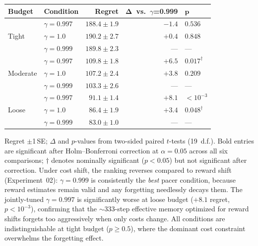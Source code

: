 \begin{center}
\small
\label{tab:exp03_ablation}
\begin{tabular}{@{}llrrl@{}}
\toprule
\textbf{Budget} & \textbf{Condition} & \textbf{Regret} & $\boldsymbol{\Delta}$\textbf{\ vs.\ $\gamma$=0.999} & $\boldsymbol{p}$ \\
\midrule
\multirow{3}{*}{Tight}
  & $\gamma{=}0.997$ & $188.4 \pm 1.9$ & $-1.4$ & $0.536$ \\
  & $\gamma{=}1.0$   & $190.2 \pm 2.7$ & $+0.4$ & $0.848$ \\
  & $\gamma{=}0.999$ & $189.8 \pm 2.3$ & --- & --- \\[2pt]
\multirow{3}{*}{Moderate}
  & $\gamma{=}0.997$ & $109.8 \pm 1.8$ & $+6.5$ & $0.017^\dagger$ \\
  & $\gamma{=}1.0$   & $107.2 \pm 2.4$ & $+3.8$ & $0.209$ \\
  & $\gamma{=}0.999$ & $103.3 \pm 2.6$ & --- & --- \\[2pt]
\multirow{3}{*}{Loose}
  & $\gamma{=}0.997$ & $91.1 \pm 1.4$ & $\mathbf{+8.1}$ & $< 10^{-3}$ \\
  & $\gamma{=}1.0$   & $86.4 \pm 1.9$ & $+3.4$ & $0.048^\dagger$ \\
  & $\gamma{=}0.999$ & $83.0 \pm 1.0$ & --- & --- \\
\bottomrule
\end{tabular}
\end{center}

\noindent
Regret $\pm$1\,SE; $\Delta$ and $p$-values from two-sided paired
$t$-tests (19~d.f.).  Bold entries are significant after
Holm--Bonferroni correction at $\alpha{=}0.05$ across all six
comparisons; $\dagger$ denotes nominally significant ($p < 0.05$)
but not significant after correction.
Under cost shift, the ranking reverses compared to reward shift
(Experiment~02): $\gamma{=}0.999$ is consistently the \emph{best}
pacer condition, because reward estimates remain valid and any
forgetting needlessly decays them.
The jointly-tuned $\gamma{=}0.997$ is significantly worse at loose
budget ($+8.1$ regret, $p < 10^{-3}$), confirming that the
${\sim}333$-step effective memory optimized for reward shifts
forgets too aggressively when only costs change.
All conditions are indistinguishable at tight budget ($p \geq 0.5$),
where the dominant cost constraint overwhelms the forgetting effect.

